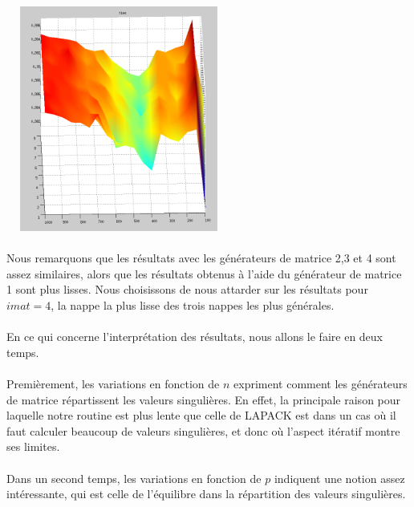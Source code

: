 \documentclass[a4paper,12pt]{article}
\begin{document}
    \begin{center}
    \includegraphics[width=20em, height=20em]{imat4.png}
    \end{center}

    \paragraph{}
    Nous remarquons que les résultats avec les générateurs de matrice 2,3 et 4
    sont assez similaires, alors que les résultats obtenus à l'aide du générateur
    de matrice 1 sont plus lisses. Nous choisissons de nous attarder sur les résultats
    pour $imat = 4$, la nappe la plus lisse des trois nappes les plus générales.

    \paragraph{}
    En ce qui concerne l'interprétation des résultats, nous allons le faire en deux temps.

    \bigskip

    \paragraph{}
    Premièrement, les variations en fonction de $n$ expriment comment les générateurs
    de matrice répartissent les valeurs singulières. En effet, la principale raison pour
    laquelle notre routine est plus lente que celle de LAPACK est dans un cas où
    il faut calculer beaucoup de valeurs singulières, et donc où l'aspect itératif
    montre ses limites.

    \paragraph{}
    Dans un second temps, les variations en fonction de $p$ indiquent une notion
    assez intéressante, qui est celle de l'équilibre dans la répartition des
    valeurs singulières.
\end{document}
